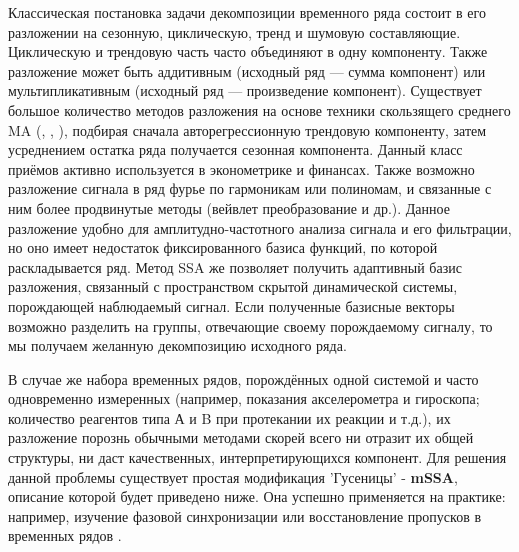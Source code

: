 		Классическая постановка задачи декомпозиции временного ряда состоит в его разложении на сезонную, циклическую, тренд и шумовую составляющие. Циклическую и трендовую часть часто объединяют в одну компоненту. Также разложение может быть аддитивным (исходный ряд --- сумма компонент) или мультипликативным (исходный ряд --- произведение компонент). Существует большое количество методов разложения на основе техники скользящего среднего MA (\cite{enders2010applied}, \cite{x11}, \cite{cleveland90}), подбирая сначала авторегрессионную трендовую компоненту, затем усреднением остатка ряда получается сезонная компонента. Данный класс приёмов активно используется в эконометрике и финансах. Также возможно разложение сигнала в ряд фурье по гармоникам или полиномам, и связанные с ним более продвинутые методы (вейвлет преобразование и др.). Данное разложение удобно для амплитудно-частотного анализа сигнала и его фильтрации, но оно имеет недостаток фиксированного базиса функций, по которой раскладывается ряд. Метод SSA же позволяет получить адаптивный базис разложения, связанный с пространством скрытой динамической системы, порождающей наблюдаемый сигнал. Если полученные базисные векторы возможно разделить на группы, отвечающие своему порождаемому сигналу, то мы получаем желанную декомпозицию исходного ряда.
		
		В случае же набора временных рядов, порождённых одной системой и часто одновременно измеренных (например, показания акселерометра и гироскопа; количество реагентов типа А и B при протекании их реакции и т.д.), их разложение порознь обычными методами скорей всего ни отразит их общей структуры, ни даст качественных, интерпретирующихся компонент. Для решения данной проблемы существует простая модификация 'Гусеницы' - \textbf{mSSA}, описание которой будет приведено ниже. Она успешно применяется на практике: например, изучение фазовой синхронизации \cite{PhysRevE.84.036206} или восстановление пропусков в временных рядов \cite{agarwal2020multivariate}.
		

